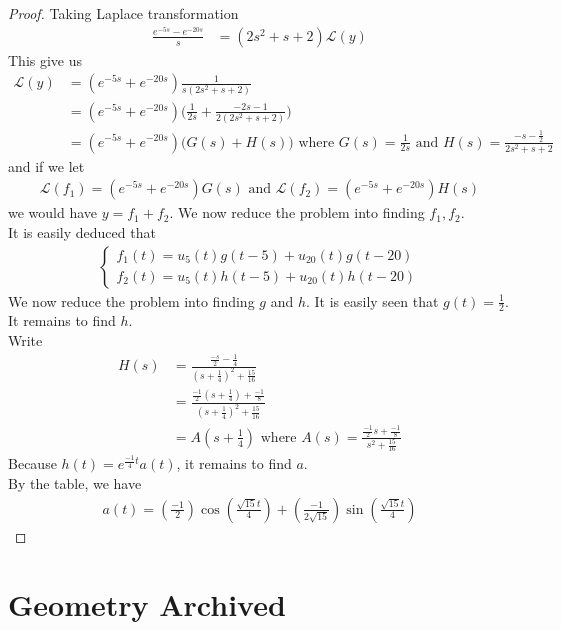 \documentclass{report}
\begin{document}
\begin{proof}
Taking Laplace transformation 
\begin{align*}
   \frac{e^{-5s}-e^{-20s}}{s}&=(2s^2+s+2) \mathcal{L}(y)
\end{align*}
This give us 
\begin{align*}
\mathcal{L}(y)&= (e^{-5s}+e^{-20s})\frac{1}{s(2s^2+s+2)}\\
              &=(e^{-5s}+e^{-20s})\Big( \frac{1}{2s} + \frac{-2s-1}{2(2s^2+s+2)} \Big)\\
              &=(e^{-5s}+e^{-20s})\Big(G(s)+ H(s) \Big)\text{ where }G(s)=\frac{1}{2s}\text{ and }H(s)= \frac{-s -\frac{1}{2}}{2s^2+s+2}
\end{align*}
and if we let 
\begin{align*}
\mathcal{L}(f_1)=(e^{-5s}+e^{-20s})G(s)\text{ and }\mathcal{L}(f_2)=(e^{-5s}+e^{-20s})H(s)
\end{align*}
we would have $y=f_1+f_2$. We now reduce the problem into finding $f_1,f_2$.\\

It is easily deduced that 
\begin{align*}
\begin{cases}
f_1(t)=u_5(t)g(t-5)+u_{20}(t)g(t-20)\\
f_2(t)=u_5(t)h(t-5)+u_{20}(t)h(t-20)
\end{cases}
\end{align*}
We now reduce the problem into finding $g$ and  $h$. It is easily seen that $g(t)=\frac{1}{2}$. It remains to find $h$.\\

Write 
\begin{align*}
H(s)&= \frac{\frac{-s}{2}- \frac{1}{4}}{(s+\frac{1}{4})^2+ \frac{15}{16}}\\
&= \frac{\frac{-1}{2}(s+\frac{1}{4})+ \frac{-1}{8}}{(s+\frac{1}{4})^2 + \frac{15}{16}}\\
&=A(s+\frac{1}{4})\text{ where }A(s)= \frac{\frac{-1}{2}s+ \frac{-1}{8}}{s^2+\frac{15}{16}}
\end{align*}
Because $h(t)=e^{\frac{-1}{4}t} a(t)$, it remains to find $a$.\\

By the table, we have 
\begin{align*}
a(t)=  (\frac{-1}{2})\cos (\frac{\sqrt{15}t}{4})+  (\frac{-1}{2\sqrt{15} })\sin (\frac{\sqrt{15}t}{4})
\end{align*}

\end{proof}
\chapter{Geometry Archived}
\end{document}
